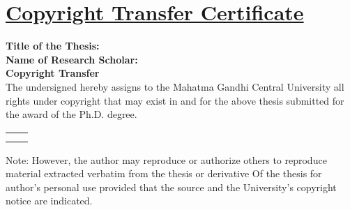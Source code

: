\chapter*{\uline{Copyright Transfer Certificate}}

\textbf{Title of the Thesis:} \Titel \\[.5cm]
\textbf{Name of Research Scholar:} \sAuthor \\[1cm]

\centering
\textbf{Copyright Transfer}\\[.5cm]
\justifying 
The undersigned hereby assigns to the Mahatma Gandhi Central University all rights under copyright that may exist in and for the above thesis submitted for the award of the Ph.D. degree.
\vspace{1.25cm} 

\begin{table}[h]
\begin{center}
\begin{tabular}{r  l}
   \begin{minipage}{0.45\textwidth}
\begin{flushleft}
\raggedright 
\end{flushleft}
\end{minipage}
&
\begin{minipage}{0.45\textwidth}
\begin{flushleft}
\raggedleft 
\begin{center}
\textbf{Signature of the Scholar}\\ 
\end{center}
\end{flushleft}
\end{minipage}
\noindent
\\
\end{tabular}
\end{center}
\end{table}
\vspace{1.25cm} 
\justifying 
Note: However, the author may reproduce or authorize others to reproduce material extracted verbatim from the thesis or derivative Of the thesis for author's personal use provided that the source and the University's copyright notice are indicated.

